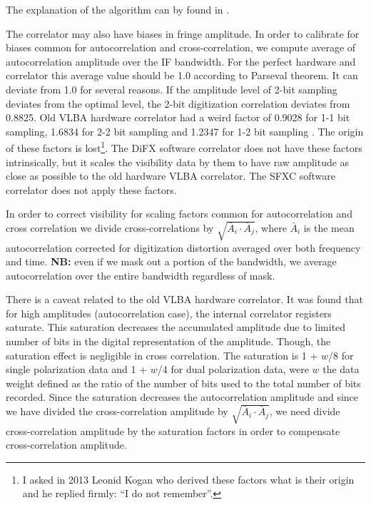 \documentclass[11pt]{article}
\begin{document}
  The explanation of the algorithm can by found in \citep{r:kog_mem6}.
             
  The correlator may also have biases in fringe amplitude. In order to
calibrate for biases common for autocorrelation and cross-correlation, we
compute average of autocorrelation amplitude over the IF bandwidth. For the 
perfect hardware and correlator this average value should be 1.0 according
to Parseval theorem. It can deviate from 1.0 for several reasons. 
If the amplitude level of 2-bit sampling deviates from the optimal level,
the 2-bit digitization correlation deviates from 0.8825. Old VLBA hardware 
correlator had a weird factor of 0.9028 for 1-1 bit sampling, 1.6834
for 2-2 bit sampling and 1.2347 for 1-2 bit sampling \citep{r:kog_mem12}.
The origin of these factors is lost\footnote{I asked in 2013 Leonid Kogan who
derived these factors what is their origin and he replied firmly: ``I do not
remember''.}. The DiFX software correlator does not have these factors 
intrinsically, but it scales the visibility data by them to have raw amplitude 
as close as possible to the old hardware VLBA correlator. The SFXC software
correlator does not apply these factors.

  In order to correct visibility for scaling factors common for autocorrelation
and cross correlation we divide cross-correlations by 
$\sqrt{\bar{A}_i \cdot \bar{A}_j}$, where $\bar{A}_i$ is the mean 
autocorrelation corrected for digitization distortion averaged over both 
frequency and time. {\bf NB:} even if we mask out a portion of the bandwidth, 
we average autocorrelation over the entire bandwidth regardless of mask.

  There is a caveat related to the old  VLBA hardware correlator. It was 
found that for high amplitudes (autocorrelation case), the internal correlator 
registers saturate. This saturation decreases the accumulated amplitude due to 
limited number of bits in the digital representation of the amplitude. Though,
the saturation effect is negligible in cross correlation. The saturation is 
1 + $w$/8 for single polarization data and 1 + $w$/4 for dual polarization 
data, were $w$ the data weight defined as the ratio of the number of bits used 
to the total number of bits recorded. Since the saturation decreases the 
autocorrelation amplitude and since we have divided the cross-correlation 
amplitude by $\sqrt{\bar{A}_i \cdot \bar{A}_j}$, we need divide 
cross-correlation amplitude by the saturation factors in order to compensate 
cross-correlation amplitude.
\end{document}
